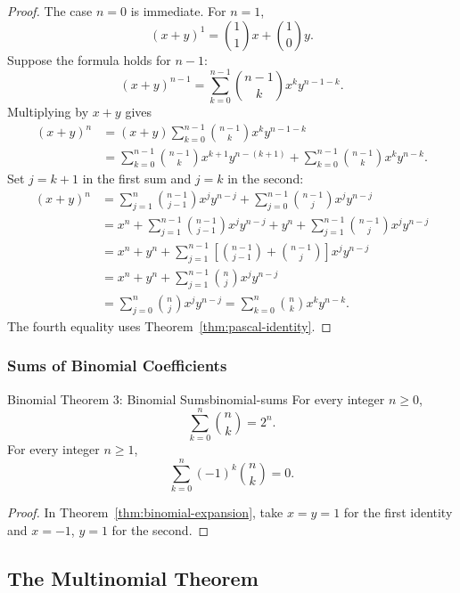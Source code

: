 \begin{proof}
  The case $n=0$ is immediate. For $n=1$,
  \[
    (x+y)^1=\binom{1}{1}x+\binom{1}{0}y.
  \]
  Suppose the formula holds for $n-1$:
  \[
    (x+y)^{n-1}=\sum_{k=0}^{n-1}\binom{n-1}{k}x^k y^{n-1-k}.
  \]
  Multiplying by $x+y$ gives
  \begin{align*}
    (x+y)^n
     & = (x+y)\sum_{k=0}^{n-1}\binom{n-1}{k}x^k y^{n-1-k} \\
     & = \sum_{k=0}^{n-1}\binom{n-1}{k}x^{k+1}y^{n-(k+1)}
    +\sum_{k=0}^{n-1}\binom{n-1}{k}x^k y^{n-k}.
  \end{align*}
  Set $j=k+1$ in the first sum and $j=k$ in the second:
  \begin{align*}
    (x+y)^n
     & = \sum_{j=1}^{n}\binom{n-1}{j-1}x^j y^{n-j}
    +\sum_{j=0}^{n-1}\binom{n-1}{j}x^j y^{n-j}                                           \\
     & = x^n+\sum_{j=1}^{n-1}\binom{n-1}{j-1}x^j y^{n-j}
    +y^n+\sum_{j=1}^{n-1}\binom{n-1}{j}x^j y^{n-j}                                       \\
     & = x^n+y^n+\sum_{j=1}^{n-1}\left[\binom{n-1}{j-1}+\binom{n-1}{j}\right]x^j y^{n-j} \\
     & = x^n+y^n+\sum_{j=1}^{n-1}\binom{n}{j}x^j y^{n-j}                                 \\
     & = \sum_{j=0}^n\binom{n}{j}x^j y^{n-j}
    = \sum_{k=0}^n\binom{n}{k}x^k y^{n-k}.
  \end{align*}
  The fourth equality uses Theorem~\ref{thm:pascal-identity}.
\end{proof}

\subsubsection{Sums of Binomial Coefficients}

\begin{theorem}{Binomial Theorem 3: Binomial Sums}{binomial-sums}
  For every integer $n\ge0$,
  \[
    \sum_{k=0}^n\binom{n}{k}=2^n.
  \]
  For every integer $n\ge1$,
  \[
    \sum_{k=0}^n(-1)^k\binom{n}{k}=0.
  \]
\end{theorem}

\begin{proof}
  In Theorem~\ref{thm:binomial-expansion}, take $x=y=1$ for the first identity and $x=-1$, $y=1$ for the second.
\end{proof}

\subsection{The Multinomial Theorem}

